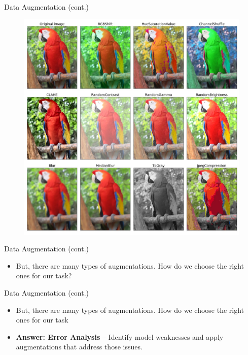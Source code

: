 \documentclass[10pt]{beamer}
\theoremstyle{remark}
\theoremstyle{definition}
\begin{document}
\begin{frame}[allowframebreaks]{Data Augmentation (cont.)}

    \begin{figure}
    \centering
    \includegraphics[width=.8\textwidth,height=.8\textheight,keepaspectratio]{./images/augmentation_new.jpg}
    \end{figure}

\end{frame}

\begin{frame}{Data Augmentation (cont.)}
\begin{itemize}
    \item But, there are many types of augmentations. How do we choose the right ones for our task?

\end{itemize}

\end{frame}

\begin{frame}{Data Augmentation (cont.)}
\begin{itemize}
    \item But, there are many types of augmentations. How do we choose the right ones for our task
    \item \textbf{Answer: Error Analysis} – Identify model weaknesses and apply augmentations that address those issues.
\end{itemize}
\end{frame}
\end{document}
